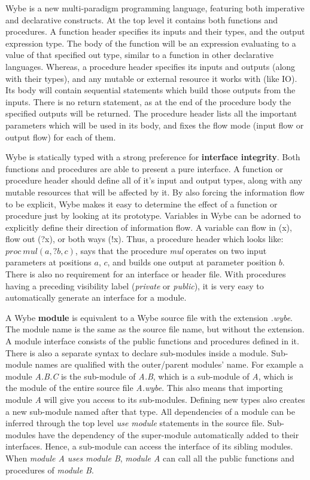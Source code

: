 Wybe is a new multi-paradigm programming language, featuring both imperative
and declarative constructs. At the top level it contains both functions and
procedures. A function header specifies its inputs and their types, and the
output expression type. The body of the function will be an expression
evaluating to a value of that specified out type, similar to a function in
other declarative languages. Whereas, a procedure header specifies its inputs
and outputs (along with their types), and any mutable or external resource it
works with (like IO). Its body will contain sequential statements which build
those outputs from the inputs. There is no return statement, as at the end of
the procedure body the specified outputs will be returned. The procedure header
lists all the important parameters which will be used in its body, and fixes
the flow mode (input flow or output flow) for each of them.

Wybe is statically typed with a strong preference for \textbf{interface
  integrity}. Both functions and procedures are able to present a pure
interface. A function or procedure header should define all of it's input and
output types, along with any mutable resources that will be affected by it. By
also forcing the information flow to be explicit, Wybe makes it easy to
determine the effect of a function or procedure just by looking at its
prototype.  Variables in Wybe can be adorned to explicitly define their
direction of information flow. A variable can flow in (x), flow out (?x), or
both ways (!x). Thus, a procedure header which looks like: $proc\ mul(a,?b,c)$,
says that the procedure \textit{mul} operates on two input parameters at
positions $a$, $c$, and builds one output at parameter position $b$. There is
also no requirement for an interface or header file. With procedures having a
preceding visibility label (\textit{private} or \textit{public}), it is very
easy to automatically generate an interface for a module.

A Wybe \textbf{module} is equivalent to a Wybe source file with the extension
\textit{.wybe}. The module name is the same as the source file name, but
without the extension. A module interface consists of the public functions and
procedures defined in it. There is also a separate syntax to declare
sub-modules inside a module. Sub-module names are qualified with the
outer/parent modules' name. For example a module \textit{A.B.C} is the
sub-module of \textit{A.B}, which is a sub-module of \textit{A}, which is the
module of the entire source file \textit{A.wybe}. This also means that
importing module \textit{A} will give you access to its sub-modules. Defining
new types also creates a new sub-module named after that type. All dependencies
of a module can be inferred through the top level \textit{use module}
statements in the source file. Sub-modules have the dependency of the
super-module automatically added to their interfaces. Hence, a sub-module can
access the interface of its sibling modules. When \textit{module A uses module
  B}, \textit{module A} can call all the public functions and procedures of
\textit{module B}.

